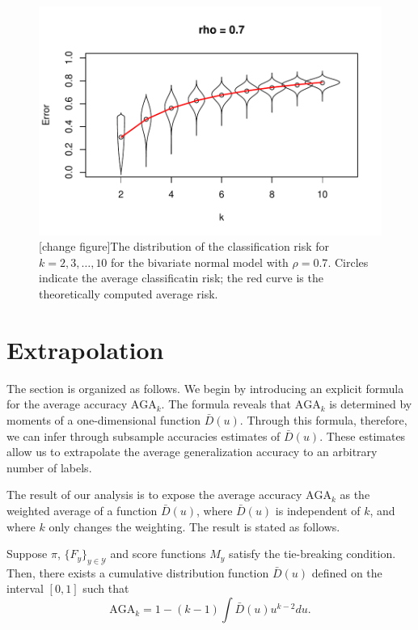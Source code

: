 \documentclass[12pt]{article}
\begin{document}
\begin{figure}[h]
\centering
\includegraphics[scale = 0.7, clip = true, trim = 0 0 0 0.5in]{illus_err_0_7.pdf}

\caption{[change figure]The distribution of the classification risk for $k = 2,3,\hdots, 10$ for the bivariate normal model with $\rho = 0.7$.
Circles indicate the average classificatin risk; the red curve is the theoretically computed average risk.}\label{fig:toy2}
\end{figure}
\section{Extrapolation}

The section is organized as follows.  We begin by introducing an explicit formula for the average accuracy $\text{AGA}_{k}$.  The formula reveals that $\text{AGA}_{k}$ is determined by moments of a one-dimensional function $\bar{D}(u)$.
Through this formula, therefore, we can infer through subsample accuracies 
estimates of $\bar{D}(u)$. 
These estimates allow us to extrapolate the average generalization
accuracy to an arbitrary number of labels.

The result of our analysis is to expose the average accuracy
$\text{AGA}_{k}$ as the weighted average of a function
$\bar{D}(u)$, where $\bar{D}(u)$ is independent of $k$, and where $k$
only changes the weighting.  The result is stated as follows.

\begin{theorem}\label{theorem:avrisk_identity}
Suppose $\pi$, $\{F_y\}_{y \in \mathcal{Y}}$ and score functions $M_y$ satisfy the tie-breaking condition.  Then, there exists a cumulative distribution function $\bar{D}(u)$ defined on the interval $[0,1]$ such that
\begin{equation}\label{eq:avrisk_identity}
\text{AGA}_{k} = 1 - (k-1) \int \bar{D}(u) u^{k-2} du.
\end{equation}
\end{theorem}
\end{document}
